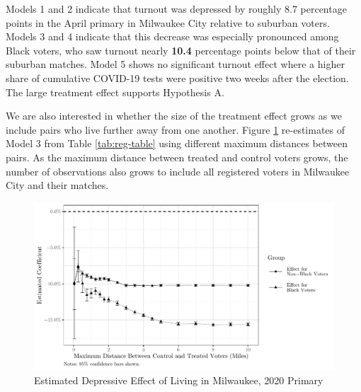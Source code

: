 \documentclass[
  12pt,
]{article}
\begin{document}
\begin{singlespace}


\end{singlespace}

Models 1 and 2 indicate that turnout was depressed by roughly 8.7 percentage points in the April primary in Milwaukee City relative to suburban voters. Models 3 and 4 indicate that this decrease was especially pronounced among Black voters, who saw turnout nearly \textbf{10.4} percentage points below that of their suburban matches. Model 5 shows no significant turnout effect where a higher share of cumulative COVID-19 tests were positive two weeks after the election. The large treatment effect supports Hypothesis A.

We are also interested in whether the size of the treatment effect grows as we include pairs who live further away from one another. Figure \ref{fig:coef-plot} re-estimates of Model 3 from Table \ref{tab:reg-table} using different maximum distances between pairs. As the maximum distance between treated and control voters grows, the number of observations also grows to include all registered voters in Milwaukee City and their matches.

\begin{figure}
\centering
\includegraphics{mke_turnout-revised_files/figure-latex/plot-1.pdf}
\caption{\label{fig:plot}\label{fig:coef-plot}Estimated Depressive Effect of Living in Milwaukee, 2020 Primary}
\end{figure}
\end{document}
